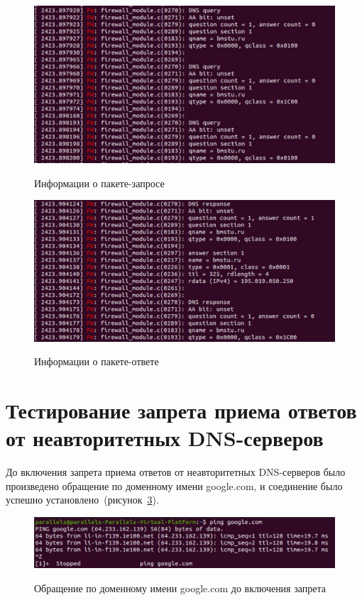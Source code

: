 \begin{figure}[h!]
	\begin{center}
		{\includegraphics[scale = 0.4]{inc/img/dns_query.jpg}}
		\caption{Информации о пакете-запросе}
		\label{img:dns_query}
	\end{center}
\end{figure}


\begin{figure}[h!]
	\begin{center}
		{\includegraphics[scale = 0.3]{inc/img/dns_response.jpg}}
		\caption{Информации о пакете-ответе}
		\label{img:dns_response}
	\end{center}
\end{figure}


\section{Тестирование запрета приема ответов от неавторитетных DNS-серверов}

До включения запрета приема ответов от неавторитетных DNS-серверов было произведено обращение по доменному имени google.com, и соединение было успешно установлено~(рисунок~\ref{img:u_before}). 

\begin{figure}[h!]
	\begin{center}
		{\includegraphics[scale = 0.35]{inc/img/u_before.jpg}}
		\caption{Обращение по доменному имени google.com до включения запрета}
		\label{img:u_before}
	\end{center}
\end{figure}


